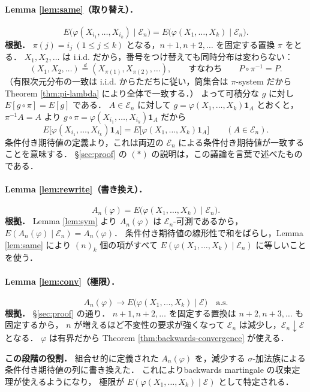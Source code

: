 \documentclass[a4paper,11pt,uplatex,dvipdfmx]{jsarticle}
\theoremstyle{plain}
\theoremstyle{definition}
\begin{document}
\paragraph{Lemma \ref{lem:same}（取り替え）．}
\[
  E\bigl(\varphi(X_{i_1},\dots,X_{i_k})\mid\mathcal{E}_n\bigr)=E\bigl(\varphi(X_1,\dots,X_k)\mid\mathcal{E}_n\bigr).
\]
\textbf{根拠．}
$\pi(j)=i_j\ (1\le j\le k)$ となる，$n+1,n+2,\dots$ を固定する置換 $\pi$ をとる．
$X_1,X_2,\dots$ は i.i.d. だから，番号をつけ替えても同時分布は変わらない：
\[
  (X_1,X_2,\dots)\overset{d}{=}(X_{\pi(1)},X_{\pi(2)},\dots),\qquad\text{すなわち}\qquad P\circ\pi^{-1}=P .
\]
（有限次元分布の一致は i.i.d. からただちに従い，筒集合は $\pi$-system だから
Theorem \ref{thm:pi-lambda} により全体で一致する．）
よって可積分な $g$ に対し $E[g\circ\pi]=E[g]$ である．
$A\in\mathcal{E}_n$ に対して $g=\varphi(X_1,\dots,X_k)\mathbf{1}_A$ とおくと，
$\pi^{-1}A=A$ より $g\circ\pi=\varphi(X_{i_1},\dots,X_{i_k})\mathbf{1}_A$ だから
\[
  E\bigl[\varphi(X_{i_1},\dots,X_{i_k})\mathbf{1}_A\bigr]=E\bigl[\varphi(X_1,\dots,X_k)\mathbf{1}_A\bigr]
  \qquad(A\in\mathcal{E}_n).
\]
条件付き期待値の定義より，これは両辺の $\mathcal{E}_n$ による条件付き期待値が一致することを意味する．
\S\ref{sec:proof} の $(\ast)$ の説明は，この議論を言葉で述べたものである．

\paragraph{Lemma \ref{lem:rewrite}（書き換え）．}
\[
  A_n(\varphi)=E\bigl(\varphi(X_1,\dots,X_k)\mid\mathcal{E}_n\bigr).
\]
\textbf{根拠．}
Lemma \ref{lem:sym} より $A_n(\varphi)$ は $\mathcal{E}_n$-可測であるから，
$E(A_n(\varphi)\mid\mathcal{E}_n)=A_n(\varphi)$．
条件付き期待値の線形性で和をばらし，Lemma \ref{lem:same} により $(n)_k$ 個の項がすべて
$E(\varphi(X_1,\dots,X_k)\mid\mathcal{E}_n)$ に等しいことを使う．

\paragraph{Lemma \ref{lem:conv}（極限）．}
\[
  A_n(\varphi)\longrightarrow E\bigl(\varphi(X_1,\dots,X_k)\mid\mathcal{E}\bigr)\quad\text{a.s.}
\]
\textbf{根拠．}
\S\ref{sec:proof} の通り．
$n+1,n+2,\dots$ を固定する置換は $n+2,n+3,\dots$ も固定するから，
$n$ が増えるほど不変性の要求が強くなって $\mathcal{E}_n$ は減少し，$\mathcal{E}_n\downarrow\mathcal{E}$ となる．
$\varphi$ は有界だから Theorem \ref{thm:backwards-convergence} が使える．

\medskip\noindent\textbf{この段階の役割．}
組合せ的に定義された $A_n(\varphi)$ を，減少する $\sigma$-加法族による条件付き期待値の列に書き換えた．
これによりbackwards martingale の収束定理が使えるようになり，
極限が $E(\varphi(X_1,\dots,X_k)\mid\mathcal{E})$ として特定される．
\end{document}
